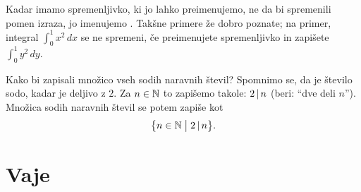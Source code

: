 Kadar imamo spremenljivko, ki jo lahko preimenujemo, ne da bi spremenili pomen izraza, jo imenujemo . Takšne primere že dobro poznate; na primer, integral $\int_0^1 x^2 \,dx$ se ne spremeni, če preimenujete spremenljivko in zapišete $\int_0^1 y^2 \,dy$.

\begin{zgled}
Kako bi zapisali množico vseh sodih naravnih števil? Spomnimo se, da je število sodo, kadar je deljivo z $2$. Za $n \in \mathbb{N}$ to zapišemo takole: $2 \,|\, n$ (beri: ``dve deli $n$''). Množica sodih naravnih števil se potem zapiše kot
\[\set[1]{n \in \NN}{2 \divides n}.\]
\end{zgled}


\section{Vaje}


